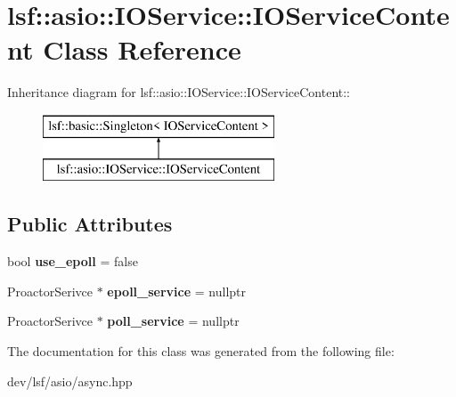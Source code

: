 \hypertarget{classlsf_1_1asio_1_1IOService_1_1IOServiceContent}{
\section{lsf::asio::IOService::IOServiceContent Class Reference}
\label{classlsf_1_1asio_1_1IOService_1_1IOServiceContent}
}
Inheritance diagram for lsf::asio::IOService::IOServiceContent::\begin{figure}[H]
\begin{center}
\leavevmode
\includegraphics[height=2cm]{classlsf_1_1asio_1_1IOService_1_1IOServiceContent}
\end{center}
\end{figure}
\subsection*{Public Attributes}
\begin{DoxyCompactItemize}
\item 
\hypertarget{classlsf_1_1asio_1_1IOService_1_1IOServiceContent_ad8e87d11d1fe2b0eac7d44bfac78fc4e}{
bool {\bfseries use\_\-epoll} = false}
\label{classlsf_1_1asio_1_1IOService_1_1IOServiceContent_ad8e87d11d1fe2b0eac7d44bfac78fc4e}

\item 
\hypertarget{classlsf_1_1asio_1_1IOService_1_1IOServiceContent_a695ecbcc6620529ab850254c9793a93c}{
ProactorSerivce $\ast$ {\bfseries epoll\_\-service} = nullptr}
\label{classlsf_1_1asio_1_1IOService_1_1IOServiceContent_a695ecbcc6620529ab850254c9793a93c}

\item 
\hypertarget{classlsf_1_1asio_1_1IOService_1_1IOServiceContent_a303ab2cecbc272778560d1a3237e02d6}{
ProactorSerivce $\ast$ {\bfseries poll\_\-service} = nullptr}
\label{classlsf_1_1asio_1_1IOService_1_1IOServiceContent_a303ab2cecbc272778560d1a3237e02d6}

\end{DoxyCompactItemize}


The documentation for this class was generated from the following file:\begin{DoxyCompactItemize}
\item 
dev/lsf/asio/async.hpp\end{DoxyCompactItemize}
